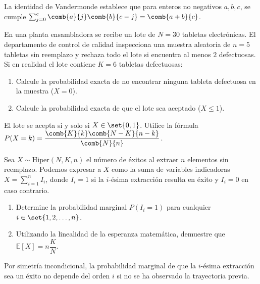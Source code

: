 \begin{sugerencia}
	La identidad de Vandermonde establece que para enteros no negativos $a, b, c$, se cumple $\sum_{j=0}^{c} \comb{a}{j} \comb{b}{c-j} = \comb{a+b}{c}$.
\end{sugerencia}

\begin{problema}
	\label{prob:3.6.2}
	En una planta ensambladora se recibe un lote de $N=30$ tabletas electrónicas. El departamento de control de calidad inspecciona una muestra aleatoria de $n=5$ tabletas sin reemplazo y rechaza todo el lote si encuentra al menos $2$ defectuosas. Si en realidad el lote contiene $K=6$ tabletas defectuosas:
	\begin{enumerate}
		\item Calcule la probabilidad exacta de no encontrar ninguna tableta defectuosa en la muestra ($X = 0$).
		\item Calcule la probabilidad exacta de que el lote sea aceptado ($X \le 1$).
	\end{enumerate}
\end{problema}

\begin{sugerencia}
	El lote se acepta si y solo si $X \in \set{0, 1}$. Utilice la fórmula $P(X=k) = \dfrac{\comb{K}{k}\comb{N-K}{n-k}}{\comb{N}{n}}$.
\end{sugerencia}

\begin{problema}
	\label{prob:3.6.3}
	Sea $X \sim \text{Hiper}(N, K, n)$ el número de éxitos al extraer $n$ elementos sin reemplazo. Podemos expresar a $X$ como la suma de variables indicadoras $X = \sum_{i=1}^n I_i$, donde $I_i = 1$ si la $i$-ésima extracción resulta en éxito y $I_i = 0$ en caso contrario.
	\begin{enumerate}
		\item Determine la probabilidad marginal $P(I_i = 1)$ para cualquier $i \in \set{1, 2, \dots, n}$.
		\item Utilizando la linealidad de la esperanza matemática, demuestre que $\mathbb{E}[X] = n \dfrac{K}{N}$.
	\end{enumerate}
\end{problema}

\begin{sugerencia}
	Por simetría incondicional, la probabilidad marginal de que la $i$-ésima extracción sea un éxito no depende del orden $i$ si no se ha observado la trayectoria previa.
\end{sugerencia}


